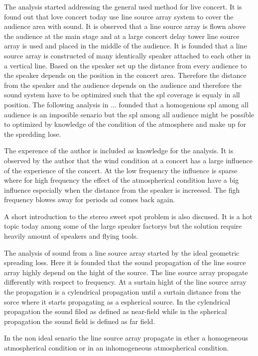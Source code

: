 
The analysis started addressing the general used method for live concert. It is found out that love concert today use line source array system to cover the audience area with sound. It is observed that a line source array is flown above the audience at the main stage and at a large concert delay tower line source array is used and placed in the middle of the audience. It is founded that a line source array is constructed of many identically speaker attached to each other in a vertical line. Based on the speaker set up the distance from every audience to the speaker depends on the position in the concert area. Therefore the distance from the speaker and the audience depends on the audience and therefore the sound system have to be optimized such that the \gls{spl} coverage is equaly in all position. The following analysis in ... founded that a homogenious \gls{spl} among all audience is an imposible senario but the \gls{spl} among all audience might be possible to optimized by knowledge of the condition of the atmosphere and make up for the spredding lose. 


The experence of the author is included as knowledge for the analysis. It is observed by the author that the wind condition at a concert has a large influence of the experience of the concert. At the low frequency the influence is sparse where for high frequency the effect of the atmospherical condition have a big influence especially when the distance from the speaker is increesed. The figh frequency blowes away for periods ad comes back again. 

A short introduction to the stereo sweet spot problem is also discused. It is a hot topic today among some of the large speaker factorys but the solution require heavily amount of speakers and flying tools. 


The analysis of sound from a line source array started by the ideal geometric spreading loss. Here it is founded that the sound propagation of the line source array highly depend on the hight of the source. The line source array propagate differently with respect to frequency. At a surtain hight of the line source array the propagation is a cylendrical propagation until a surtain distance from the sorce where it starts propagating as a espherical source. In the cylendrical propagation the sound filed as defined as near-field while in the spherical propagation the sound field is defined as far field. 

In the non ideal senario the line source array propagate in ether a homogeneous atmospherical condition or in an inhomogeneous atmospherical condition. 


